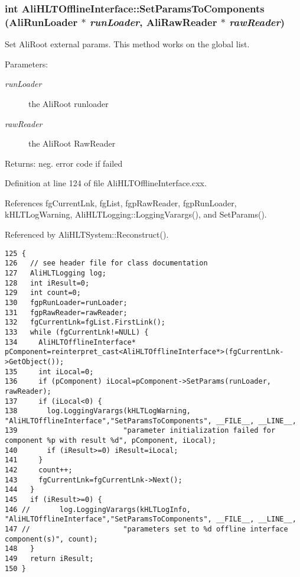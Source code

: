 \subsubsection{\setlength{\rightskip}{0pt plus 5cm}int Ali\-HLTOffline\-Interface::Set\-Params\-To\-Components (Ali\-Run\-Loader $\ast$ {\em run\-Loader}, Ali\-Raw\-Reader $\ast$ {\em raw\-Reader})\hspace{0.3cm}{\tt  [static]}}\label{classAliHLTOfflineInterface_e0}


Set Ali\-Root external params. This method works on the global list. \begin{Desc}
\item[Parameters:]
\begin{description}
\item[{\em run\-Loader}]the Ali\-Root runloader \item[{\em raw\-Reader}]the Ali\-Root Raw\-Reader \end{description}
\end{Desc}
\begin{Desc}
\item[Returns:]neg. error code if failed \end{Desc}


Definition at line 124 of file Ali\-HLTOffline\-Interface.cxx.

References fg\-Current\-Lnk, fg\-List, fgp\-Raw\-Reader, fgp\-Run\-Loader, k\-HLTLog\-Warning, Ali\-HLTLogging::Logging\-Varargs(), and Set\-Params().

Referenced by Ali\-HLTSystem::Reconstruct().

\footnotesize\begin{verbatim}125 {
126   // see header file for class documentation
127   AliHLTLogging log;
128   int iResult=0;
129   int count=0;
130   fgpRunLoader=runLoader;
131   fgpRawReader=rawReader;
132   fgCurrentLnk=fgList.FirstLink();
133   while (fgCurrentLnk!=NULL) {
134     AliHLTOfflineInterface* pComponent=reinterpret_cast<AliHLTOfflineInterface*>(fgCurrentLnk->GetObject());
135     int iLocal=0;
136     if (pComponent) iLocal=pComponent->SetParams(runLoader, rawReader);
137     if (iLocal<0) {
138       log.LoggingVarargs(kHLTLogWarning, "AliHLTOfflineInterface","SetParamsToComponents", __FILE__, __LINE__,
139                         "parameter initialization failed for component %p with result %d", pComponent, iLocal);
140       if (iResult>=0) iResult=iLocal;
141     }
142     count++;
143     fgCurrentLnk=fgCurrentLnk->Next();
144   }
145   if (iResult>=0) {
146 //       log.LoggingVarargs(kHLTLogInfo, "AliHLTOfflineInterface","SetParamsToComponents", __FILE__, __LINE__,
147 //                      "parameters set to %d offline interface component(s)", count);
148   }
149   return iResult;
150 }
\end{verbatim}\normalsize 


